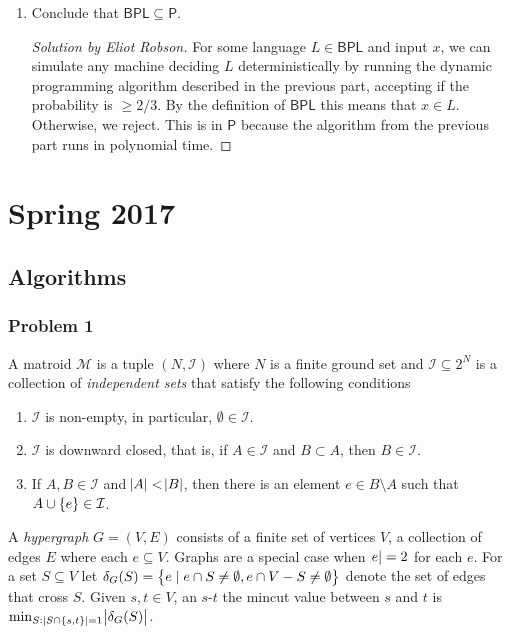 \documentclass{article}
\newenvironment{solution}[1]{\begin{proof}[Solution by #1]}{\end{proof}}
\newcommand{\Pe}{\mathsf{P}}
\newcommand{\BPL}{\mathsf{BPL}}
\begin{document}
\begin{enumerate}
	\item Conclude that \(\BPL \subseteq \Pe\).
    
    \begin{solution}{Eliot Robson}
        For some language \(L \in \BPL\) and input \(x\), we can simulate any machine deciding \(L\) deterministically by running the dynamic programming algorithm described in the previous part, accepting if the probability is \(\geq 2/3\). By the definition of \(\BPL\) this means that \(x \in L\). Otherwise, we reject. This is in \(\Pe\) because the algorithm from the previous part runs in polynomial time.
    \end{solution}
\end{enumerate}

\section{Spring 2017}

\subsection{Algorithms}

\subsubsection{Problem 1}
A matroid \(\mathcal{M}\) is a tuple \((N, \mathcal{I})\) where \(N\) is a finite ground set and \(\mathcal{I} \subseteq 2^{N}\) is a collection of \emph{independent sets} that satisfy the following conditions
\begin{enumerate}
	\item \(\mathcal{I}\) is non-empty, in particular, \(\emptyset \in \mathcal{I}\). 
	
	\item \(\mathcal{I}\) is downward closed, that is, if \(A \in \mathcal{I}\) and \(B \subset A\), then \(B \in \mathcal{I}\).
	
	\item If \(A,B \in \mathcal{I}\) and \(\abs{A} < \abs{B}\), then there is an element \(e \in B \setminus A\) such that \(A \cup \set{e} \in \mathcal{I}\).
\end{enumerate}

A \emph{hypergraph} \(G = (V,E)\) consists of a finite set of vertices \(V\), a collection of edges \(E\) where each \(e \subseteq V\). Graphs are a special case when \(\abs{e} = 2\) for each \(e\). For a set \(S \subseteq V\) let \(\delta_G (S) = \set{e \mid e \cap S \neq \emptyset, e \cap V - S \neq \emptyset}\) denote the set of edges that cross \(S\). Given \(s,t \in V\), an \(s\)-\(t\) the mincut value between \(s\) and \(t\) is \(\min_{S : \abs[0]{S \cap \set{s,t}} = 1} \abs{\delta_G (S)}\).
\end{document}
